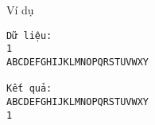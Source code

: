 Ví dụ
\begin{verbatim}
Dữ liệu:
1
ABCDEFGHIJKLMNOPQRSTUVWXY

Kết quả:
ABCDEFGHIJKLMNOPQRSTUVWXY
1
\end{verbatim}